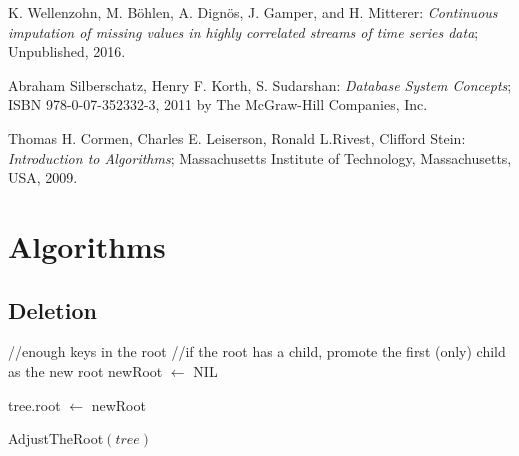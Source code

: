 \documentclass[abstracton,12pt,oneside]{scrreprt}
\begin{document}
\begin{thebibliography}{99}
	
	
	 K. Wellenzohn, M. Böhlen, A. Dignös, J. Gamper, and H. Mitterer: \emph{Continuous imputation of missing values in highly correlated streams of time series data}; Unpublished, 2016.
	
	 Abraham Silberschatz, Henry F. Korth, S. Sudarshan: \emph{Database System Concepts}; ISBN 978-0-07-352332-3, 2011 by The McGraw-Hill Companies, Inc.
	
	 Thomas H. Cormen, Charles E. Leiserson, Ronald L.Rivest, Clifford Stein: \emph{Introduction to Algorithms}; Massachusetts Institute of Technology, Massachusetts, USA, 2009. 
	
	
\end{thebibliography}




\appendix%

\appendixpage


\addappheadtotoc
\chapter{Algorithms}



\section{Deletion}

\begin{algorithm}[H]
	\IncMargin{1em}
	\SetAlgoLined
	\DontPrintSemicolon
	
	//enough keys in the root\;
	//if the root has a child, promote the first (only) child as the new root\;
	{
		newRoot $\leftarrow$ NIL\;
	}
	
	tree.root $\leftarrow$ newRoot\;
	
	\caption{AdjustTheRoot$(tree)$}	\label{adjustTheRoot}
\end{algorithm}
\end{document}
